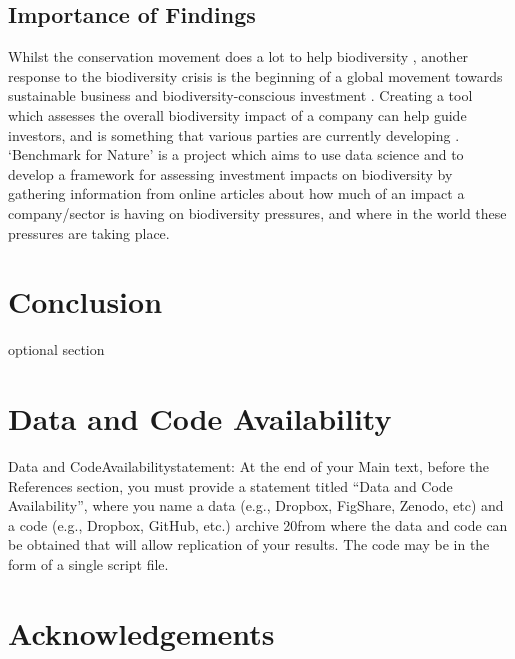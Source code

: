 \documentclass[11pt, a4paper, titlepage]{article}
\begin{document}
     \subsection*{Importance of Findings}
     Whilst the conservation movement does a lot to help biodiversity \citep{sandbrook2019global}, another response to the biodiversity crisis \citep{ogar2020science} is the beginning of a global movement towards sustainable business and biodiversity-conscious investment \citep{pri2020, worldeconomicforum2020, wwf2020}. Creating a tool which assesses the overall biodiversity impact of a company can help guide investors, and is something that various parties are currently developing \citep{worldbenchmarkingalliance_2022, iccs_2020}.  `Benchmark for Nature' is a project which aims to use data science and to develop a framework for assessing investment impacts on biodiversity by gathering information from online articles about how much of an impact a company/sector is having on biodiversity pressures\citep{iccs_2020}, and where in the world these pressures are taking place. 
     \clearpage
     
     \section*{Conclusion }
     optional section
     \clearpage
    
    \section*{Data and Code Availability}
    Data  and  CodeAvailabilitystatement:  At  the  end  of  your  Main  text,  before  the  References section, you must provide a statement titled “Data and Code Availability”, where you name a data (e.g., Dropbox, FigShare, Zenodo, etc) and a code (e.g., Dropbox, GitHub, etc.) archive 
    20from where the data and code can be obtained that will allow replication of your results. The code may be in the form of a single script file.
    
    \clearpage
    \section*{Acknowledgements}
    

    
\end{document}
